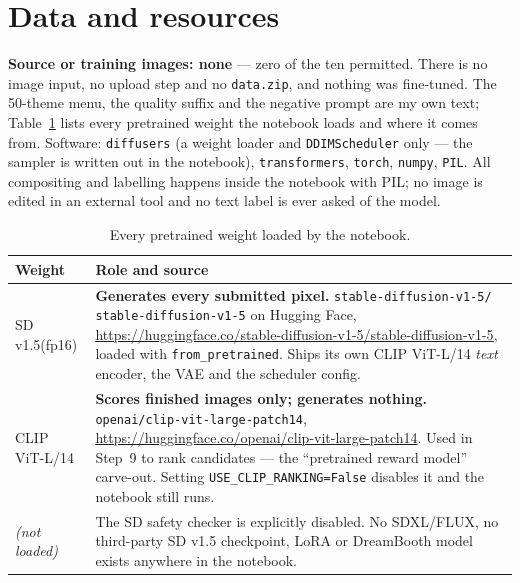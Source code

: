 \documentclass[10pt,a4paper,twocolumn]{article}
\newcommand{\tw}[1]{\texttt{\footnotesize #1}}
\begin{document}
\section{Data and resources}

\textbf{Source or training images: none} --- zero of the ten permitted. There is no
image input, no upload step and no \tw{data.zip}, and nothing was fine-tuned. The
50-theme menu, the quality suffix and the negative prompt are my own text;
Table~\ref{tab:weights} lists every pretrained weight the notebook loads and where
it comes from. Software: \tw{diffusers} (a weight loader and \tw{DDIMScheduler}
only --- the sampler is written out in the notebook), \tw{transformers},
\tw{torch}, \tw{numpy}, \tw{PIL}. All compositing and labelling happens inside the
notebook with PIL; no image is edited in an external tool and no text label is
ever asked of the model.

\begin{table}[t]
\centering\small
\caption{Every pretrained weight loaded by the notebook.}
\label{tab:weights}
\begin{tabularx}{\columnwidth}{@{}>{\raggedright\arraybackslash}p{1.95cm}@{\hspace{4pt}}>{\raggedright\arraybackslash}X@{}}
\toprule
\textbf{Weight} & \textbf{Role and source}\\
\midrule
SD v1.5\newline(fp16) &
\textbf{Generates every submitted pixel.} \tw{stable-diffusion-v1-5/} \tw{stable-diffusion-v1-5} on Hugging Face,\newline
\url{https://huggingface.co/stable-diffusion-v1-5/stable-diffusion-v1-5}, loaded with \tw{from\_pretrained}. Ships its own CLIP ViT-L/14 \emph{text} encoder, the VAE and the scheduler config.\\
\addlinespace[2pt]
CLIP ViT-L/14 &
\textbf{Scores finished images only; generates nothing.} \tw{openai/clip-vit-large-patch14},\newline
\url{https://huggingface.co/openai/clip-vit-large-patch14}. Used in Step~9 to rank candidates --- the ``pretrained reward model'' carve-out. Setting \tw{USE\_CLIP\_RANKING=False} disables it and the notebook still runs.\\
\addlinespace[2pt]
\emph{(not loaded)} & The SD safety checker is explicitly disabled. No SDXL/FLUX, no third-party SD v1.5 checkpoint, LoRA or DreamBooth model exists anywhere in the notebook.\\
\bottomrule
\end{tabularx}
\end{table}
\end{document}

